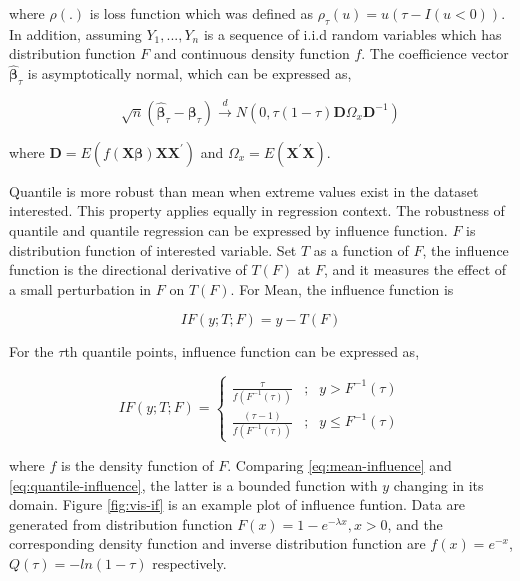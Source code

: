 \documentclass[11pt,a4paper,]{article}
\theoremstyle{definition}
\theoremstyle{definition}
\theoremstyle{remark}
\begin{document}
where \(\rho(.)\) is loss function which was defined as
\(\rho_{\tau}(u)=u(\tau-I(u <0))\). In addition, assuming
\(Y_1,...,Y_n\) is a sequence of i.i.d random variables which has
distribution function \(F\) and continuous density function \(f\). The
coefficience vector \(\hat{\boldsymbol{\beta}}_{\tau}\) is
asymptotically normal, which can be expressed as,

\begin{equation}
\sqrt{n}(\hat{\boldsymbol{\beta}}_{\tau}-\boldsymbol{\beta}_{\tau}) \xrightarrow{d}
N(0,\tau(1-\tau)\boldsymbol{D}\boldsymbol{\varOmega}_{x}\boldsymbol{D}^{-1})
\label{eq:distrbution}
\end{equation}

where
\(\boldsymbol{D}=E(f(\boldsymbol{X}\boldsymbol{\beta})\boldsymbol{X}\boldsymbol{X}^{'})\)
and \(\boldsymbol{\varOmega}_{x}=E(\boldsymbol{X}^{'}\boldsymbol{X})\).

Quantile is more robust than mean when extreme values exist in the
dataset interested. This property applies equally in regression context.
The robustness of quantile and quantile regression can be expressed by
influence function. \(F\) is distribution function of interested
variable. Set \(T\) as a function of \(F\), the influence function is
the directional derivative of \(T(F)\) at \(F\), and it measures the
effect of a small perturbation in \(F\) on \(T(F)\). For Mean, the
influence function is

\begin{equation}
IF(y;T;F)=y-T(F)
\label{eq:mean-influence}
\end{equation}

For the \(\tau\)th quantile points, influence function can be expressed
as,

\begin{equation}
IF(y;T;F)=\left\{
\begin{aligned}
\frac{\tau}{f(F^{-1}(\tau))} & ; & y > F^{-1}(\tau) \\
\frac{(\tau-1)}{f(F^{-1}(\tau))} & ; & y \leq F^{-1}(\tau) 
\end{aligned}
\right.
\label{eq:quantile-influence}
\end{equation}

where \(f\) is the density function of \(F\). Comparing
\eqref{eq:mean-influence} and \eqref{eq:quantile-influence}, the latter is a
bounded function with \(y\) changing in its domain. Figure
\ref{fig:vis-if} is an example plot of influence funtion. Data are
generated from distribution function \(F(x)=1-e^{-\lambda x},x>0\), and
the corresponding density function and inverse distribution function are
\(f(x)=e^{-x}\), \(Q(\tau)=-ln(1-\tau)\) respectively.
\end{document}
